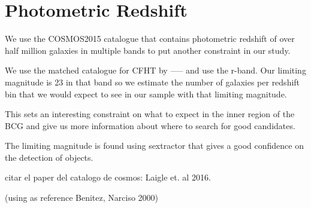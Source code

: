 \section{Photometric Redshift}

We use the COSMOS2015 catalogue that contains photometric redshift of over half million galaxies in multiple bands to put another constraint in our study.

We use the matched catalogue for CFHT by ----- and use the r-band. Our limiting magnitude is 23 in that band so we estimate the number of galaxies per redshift bin that we would expect to see in our sample with that limiting magnitude.

This sets an interesting constraint on what to expect in the inner region of the BCG and give us more information about where to search for good candidates.

The limiting magnitude is found using sextractor that gives a good confidence on the detection of objects.

citar el paper del catalogo de cosmos: Laigle et. al 2016.



(using as reference Benitez, Narciso 2000)